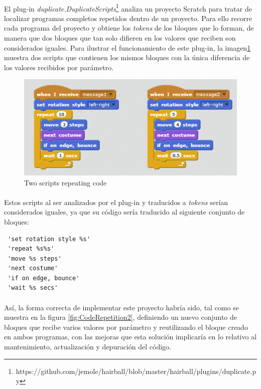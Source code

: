 \documentclass[a4paper,10pt]{article}
\begin{document}
\paragraph{}El plug-in \textit{duplicate.DuplicateScripts}\footnote{https://github.com/jemole/hairball/blob/master/hairball/plugins/duplicate.py} analiza un proyecto Scratch para tratar de localizar programas completos repetidos dentro de un proyecto. Para ello recorre cada programa del proyecto y obtiene los \textit{tokens} de los bloques que lo forman, de manera que dos bloques que tan solo difieren en los valores que reciben son considerados iguales. Para ilustrar el funcionamiento de este plug-in, la imagen\ref{fig:CodeRepetition1} muestra dos scripts que contienen los mismos bloques con la única diferencia de los valores recibidos por parámetro. 
\begin{figure}
  \centering
    \includegraphics{img/CodeRepetition1.png}
  \caption{Two scripts repeating code}
  \label{fig:CodeRepetition1}
\end{figure}

\paragraph{}Estos scripts al ser analizados por el plug-in y traducidos a \textit{tokens} serían considerados iguales, ya que su código sería traducido al siguiente conjunto de bloques:
\begin{verbatim}
 'set rotation style %s'
 'repeat %s%s'
 'move %s steps'
 'next costume'
 'if on edge, bounce'
 'wait %s secs'
\end{verbatim}
\paragraph{} Así, la forma correcta de implementar este proyecto habría sido, tal como se muestra en la figura \ref{fig:CodeRepetition2}, definiendo un nuevo conjunto de bloques que recibe varios valores por parámetro y reutilizando el bloque creado en ambos programas, con las mejoras que esta solución implicaría en lo relativo al mantenimiento, actualización y depuración del código.
\end{document}
